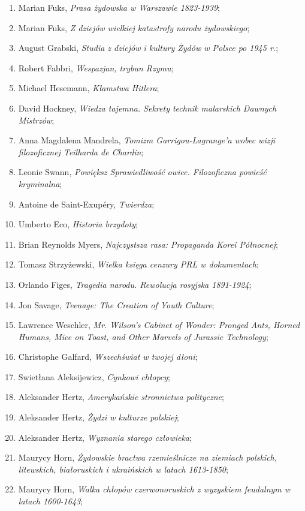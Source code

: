 \documentclass[a4paper,11pt]{article}
\begin{document}
\begin{enumerate}
\item Marian Fuks, \emph{Prasa żydowska w Warszawie 1823-1939};
\item Marian Fuks, \emph{Z dziejów wielkiej katastrofy narodu
    żydowskiego};
\item August Grabski, \emph{Studia z dziejów i kultury Żydów w Polsce
    po 1945 r.};
\item Robert Fabbri, \emph{Wespazjan, trybun Rzymu};
\item Michael Hesemann, \emph{Kłamstwa Hitlera};
\item David Hockney, \emph{Wiedza tajemna. Sekrety technik malarskich
    Dawnych Mistrzów};
\item Anna Magdalena Mandrela, \emph{Tomizm Garrigou-Lagrange’a wobec
    wizji filozoficznej Teilharda de Chardin};
\item Leonie Swann, \emph{Powiększ Sprawiedliwość owiec. Filozoficzna
    powieść kryminalna};
\item Antoine de Saint-Exupéry, \emph{Twierdza};
\item Umberto Eco, \emph{Historia brzydoty};
\item Brian Reynolds Myers, \emph{Najczystsza rasa: Propaganda Korei
    Północnej};
\item Tomasz Strzyżewski, \emph{Wielka księga cenzury PRL w
    dokumentach};
\item Orlando Figes, \emph{Tragedia narodu. Rewolucja rosyjska
    1891-1924};
\item Jon Savage, \emph{Teenage: The Creation of Youth Culture};
\item Lawrence Weschler, \emph{Mr. Wilson's Cabinet of Wonder: Pronged
    Ants, Horned Humans, Mice on Toast, and Other Marvels of Jurassic
    Technology};
\item Christophe Galfard, \emph{Wszechświat w twojej dłoni};
\item Swietłana Aleksijewicz, \emph{Cynkowi chłopcy};
\item Aleksander Hertz, \emph{Amerykańskie stronnictwa polityczne};
\item Aleksander Hertz, \emph{Żydzi w kulturze polskiej};
\item Aleksander Hertz, \emph{Wyznania starego człowieka};
\item Maurycy Horn, \emph{Żydowskie bractwa rzemieślnicze na ziemiach
    polskich, litewskich, białoruskich i ukraińskich w latach
    1613-1850};
\item Maurycy Horn, \emph{Walka chłopów czerwonoruskich z wyzyskiem
    feudalnym w latach 1600-1643};

\end{enumerate}
\end{document}
